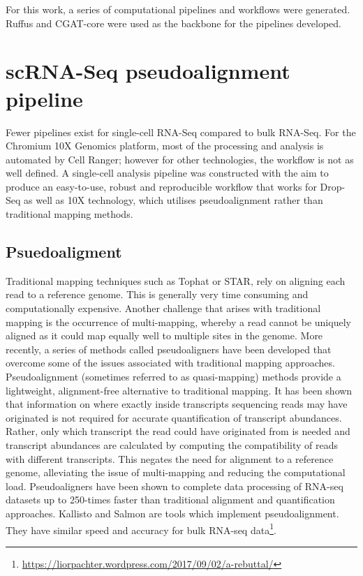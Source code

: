 For this work, a series of computational pipelines and workflows were generated.
Ruffus and CGAT-core\cite{cribbs2019cgat} were used as the backbone for the pipelines developed.

\section{scRNA-Seq pseudoalignment pipeline}\label{sec:scRNA_pipeline}
Fewer pipelines exist for single-cell RNA-Seq compared to bulk RNA-Seq.
For the Chromium 10X Genomics platform, most of the processing and analysis is automated by Cell Ranger;
however for other technologies, the workflow is not as well defined.
A single-cell analysis pipeline was constructed with the aim to produce an easy-to-use, robust and reproducible workflow that works for Drop-Seq as well as 10X technology, which utilises pseudoalignment rather than traditional mapping methods.

\subsection{Psuedoaligment}
Traditional mapping techniques such as Tophat\cite{trapnell2009tophat} or STAR\cite{dobin2013star}, rely on aligning each read to a reference genome.
This is generally very time consuming and computationally expensive.
Another challenge that arises with traditional mapping is the occurrence of multi-mapping, whereby a read cannot be uniquely aligned as it could map equally well to multiple sites in the genome\cite{mortazavi2008mapping}.
More recently, a series of methods called pseudoaligners have been developed that overcome some of the issues associated with traditional mapping approaches.
Pseudoalignment (sometimes referred to as quasi-mapping) methods provide a lightweight, alignment-free alternative to traditional mapping.
It has been shown that information on where exactly inside transcripts sequencing reads may have originated is not required for accurate quantification of transcript abundances\cite{nicolae2010estimation}.
Rather, only which transcript the read could have originated from is needed and transcript abundances are calculated by computing the compatibility of reads with different transcripts.
This negates the need for alignment to a reference genome, alleviating the issue of multi-mapping and reducing the computational load.
Pseudoaligners have been shown to complete data processing of RNA-seq datasets up to 250-times faster than traditional alignment and quantification approaches\cite{bray2016near}.
Kallisto\cite{bray2016near} and Salmon\cite{patro2017salmon} are tools which implement pseudoalignment.
They have similar speed and accuracy for bulk RNA-seq data\footnote{\url{https://liorpachter.wordpress.com/2017/09/02/a-rebuttal/}}.

